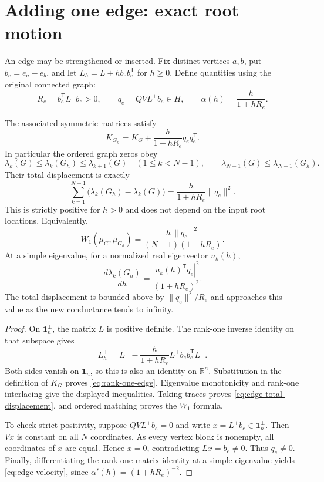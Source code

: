 \section{Adding one edge: exact root motion}\label{sec:edge-motion}

An edge may be strengthened or inserted.  Fix distinct vertices $a,b$,
put $b_e=e_a-e_b$, and let $L_h=L+h b_e b_e^{\mathsf T}$ for $h\geq0$.
Define quantities using the original connected graph:
\[
 R_e=b_e^{\mathsf T}L^+b_e>0,\qquad
 q_e=QV L^+b_e\in H,\qquad
 \alpha(h)=\frac{h}{1+hR_e}.
\]

\begin{theorem}\label{thm:edge-law}
The associated symmetric matrices satisfy
\begin{equation}\label{eq:rank-one-edge}
 \boxed{\quad K_{G_h}=K_G+\frac{h}{1+hR_e}q_e q_e^{\mathsf T}.\quad}
\end{equation}
In particular the ordered graph zeros obey
\[
 \lambda_k(G)\leq\lambda_k(G_h)\leq\lambda_{k+1}(G)
 \quad(1\leq k<N-1),\qquad
 \lambda_{N-1}(G)\leq\lambda_{N-1}(G_h).
\]
Their total displacement is exactly
\begin{equation}\label{eq:edge-total-displacement}
 \boxed{\quad
 \sum_{k=1}^{N-1}\bigl(\lambda_k(G_h)-\lambda_k(G)\bigr)
 =\frac{h}{1+hR_e}\|q_e\|^2.
 \quad}
\end{equation}
This is strictly positive for $h>0$ and does not depend on the input
root locations.  Equivalently,
\[
 W_1(\mu_G,\mu_{G_h})
 =\frac{h\,\|q_e\|^2}{(N-1)(1+hR_e)}.
\]
At a simple eigenvalue, for a normalized real eigenvector $u_k(h)$,
\begin{equation}\label{eq:edge-velocity}
 \frac{d\lambda_k(G_h)}{dh}
 =\frac{|u_k(h)^{\mathsf T}q_e|^2}{(1+hR_e)^2}.
\end{equation}
The total displacement is bounded above by $\|q_e\|^2/R_e$ and
approaches this value as the new conductance tends to infinity.
\end{theorem}

\begin{proof}
On $\boldsymbol1_n^\perp$, the matrix $L$ is positive definite.  The
rank-one inverse identity on that subspace gives
\[
 L_h^+=L^+-\frac{h}{1+hR_e}
                 L^+b_e b_e^{\mathsf T}L^+.
\]
Both sides vanish on $\boldsymbol1_n$, so this is also an identity
on $\mathbb R^n$.  Substitution in the definition of $K_G$ proves
\eqref{eq:rank-one-edge}.  Eigenvalue monotonicity and rank-one
interlacing give the displayed inequalities.  Taking traces proves
\eqref{eq:edge-total-displacement}, and ordered matching proves the
$W_1$ formula.

To check strict positivity, suppose $QV L^+b_e=0$ and write
$x=L^+b_e\in\boldsymbol1_n^\perp$.  Then $Vx$ is constant on all
$N$ coordinates.  As every vertex block is nonempty, all coordinates
of $x$ are equal.  Hence $x=0$, contradicting $Lx=b_e\ne0$.
Thus $q_e\ne0$.  Finally, differentiating the rank-one matrix
identity at a simple eigenvalue yields
\eqref{eq:edge-velocity}, since $\alpha'(h)=(1+hR_e)^{-2}$.
\end{proof}

